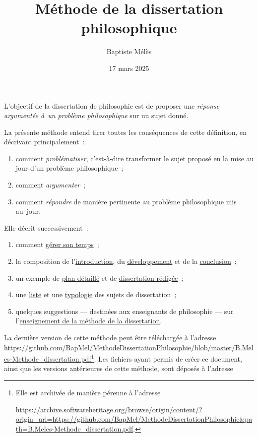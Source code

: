 \documentclass[a4paper,12pt]{report}
\author{Baptiste Mélès}
\date{17 mars 2025}
\title{Méthode de la dissertation philosophique}
\begin{document}
\maketitle
\bigskip

L'objectif de la dissertation de philosophie est de proposer une
\emph{réponse argumentée à un problème philosophique} sur un sujet donné.

La présente méthode entend tirer toutes les conséquences de cette
définition, en décrivant principalement :
\begin{enumerate}
\item comment \emph{problématiser}, c'est-à-dire transformer le sujet proposé en la
mise au jour d'un problème philosophique ;
\item comment \emph{argumenter} ;
\item comment \emph{répondre} de manière pertinente au problème philosophique
mis au jour.
\end{enumerate}

Elle décrit successivement :
\begin{enumerate}
\item comment \hyperref[orga01d9f0]{gérer son temps} ;
\item la composition de l'\hyperref[org3d2489c]{introduction}, du \hyperref[org3c71820]{développement} et de la
\hyperref[org2f51e6d]{conclusion} ;
\item un exemple de \hyperref[org2e88530]{plan détaillé} et de \hyperref[orge2b010e]{dissertation rédigée} ;
\item une \hyperref[orgf9e0bcb]{liste} et une \hyperref[org766ad51]{typologie} des sujets de dissertation ;
\item quelques suggestions — destinées aux enseignants de philosophie — sur
l'\hyperref[org325b945]{enseignement de la méthode de la dissertation}.
\end{enumerate}

La dernière version de cette méthode peut être téléchargée à l'adresse
\url{https://github.com/BapMel/MethodeDissertationPhilosophie/blob/master/B.Meles-Methode\_dissertation.pdf}\footnote{Elle est archivée de manière pérenne à l'adresse

\noindent
\url{https://archive.softwareheritage.org/browse/origin/content/?origin\_url=https://github.com/BapMel/MethodeDissertationPhilosophie\&path=B.Meles-Methode\_dissertation.pdf}.}.
Les fichiers ayant permis de créer ce document, ainsi que les versions
antérieures de cette méthode, sont déposés à l'adresse
\end{document}
